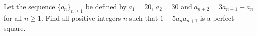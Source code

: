 Let the sequence $ \{a_n\}_{n\geq 1}$ be defined by $ a_1 = 20$,  $ a_2 = 30$ and $ a_{n + 2} = 3a_{n + 1} - a_n$ for all $ n\geq 1$. Find all positive integers $ n$ such that $ 1 + 5a_n a_{n + 1}$ is a perfect square.